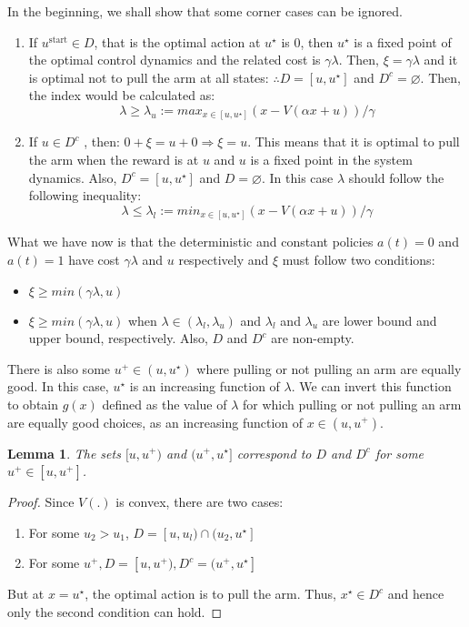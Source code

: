 \documentclass[conference]{IEEEtran}
\newtheorem{lemm}[theorem]{Lemma}
\begin{document}
In the beginning, we shall show that some corner cases can be ignored. 
\begin{enumerate}
    \item If $u^{\text{start}} \in D$, that is the optimal action at $u^{\star}$ is 0, then $u^{\star}$ is a fixed point of the optimal control dynamics and the related cost is $\gamma \lambda$. Then, $\xi = \gamma \lambda$ and it is optimal not to pull the arm at all states: $\therefore D=\left [ u,u^{\star} \right ]$ and $D^{c}=\varnothing$. Then, the index would be calculated as:
    \begin{equation}
        \lambda \geq \lambda_u := max_{x\in \left [u, u^{\star} \right ]} (x-V(\alpha x + u))/\gamma
    \end{equation}
    \item If $u \in D^{c}$ , then: $0+\xi = u+0 \Rightarrow \xi = u$. This means that it is optimal to pull the arm when the reward is at $u$ and $u$ is a fixed point in the system dynamics. Also, $D^{c}= \left [ u, u^{\star} \right ]$ and $D=\varnothing$. In this case $\lambda$ should follow the following inequality:
    \begin{equation}
        \lambda \leq \lambda_l := min_{x \in \left [ u, u^{\star} \right ]} (x - V(\alpha x + u))/\gamma
    \end{equation}

\end{enumerate}
What we have now is that the deterministic and constant policies $a(t)=0$ and $a(t)=1$ have cost $\gamma \lambda$ and $u$ respectively and $\xi$ must follow two conditions:
\begin{itemize}
    \item $\xi \geq min(\gamma \lambda, u)$
    \item $\xi \geq min(\gamma \lambda, u)$ when $\lambda \in (\lambda_l, \lambda_u)$ and $\lambda_l$ and $\lambda_u$ are lower bound and upper bound, respectively. Also, $D$ and $D^{c}$ are non-empty.
\end{itemize}

There is also some $u^{+}\in \left ( u, u^{\star} \right )$ where pulling or not pulling an arm are equally good. In this case, $u^{\star}$ is an increasing function of $\lambda$. We can invert this function to obtain $g(x)$ defined as the value of $\lambda$ for which pulling or not pulling an arm are equally good choices, as an increasing function of $x\in(u, u^{+})$.
\begin{lemm}
  The sets $ [ u, u^{+})$ and $(u^{+}, u^{\star} ]$ correspond to $D$ and $D^{c}$ for some $u^{+} \in [ u, u^{+} ] $.
\end{lemm}
\begin{proof}
    Since $V(.)$ is convex, there are two cases:
    \begin{enumerate}
        \item For some $u_2>u_1$, $D= [ u, u_l) \cap (u_2, u^{\star} ]$
        \item For some $u^{+}, D= [u, u^{+}), D^{c}=(u^{+}, u^{\star} ]$
    \end{enumerate}
    But at $x=u^{\star}$, the optimal action is to pull the arm. Thus, $x^{\star} \in D^{c}$ and hence only the second condition can hold.
\end{proof}
\end{document}
